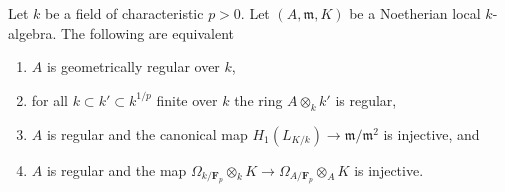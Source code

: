\begin{proposition}
\label{proposition-characterization-geometrically-regular}
Let $k$ be a field of characteristic $p > 0$.
Let $(A, \mathfrak m, K)$ be a Noetherian local
$k$-algebra. The following are equivalent
\begin{enumerate}
\item $A$ is geometrically regular over $k$,
\item for all $k \subset k' \subset k^{1/p}$
finite over $k$ the ring $A \otimes_k k'$ is regular,
\item $A$ is regular and the canonical map
$H_1(L_{K/k}) \to \mathfrak m/\mathfrak m^2$ is injective, and
\item $A$ is regular and the map
$\Omega_{k/\mathbf{F}_p} \otimes_k K \to \Omega_{A/\mathbf{F}_p} \otimes_A K$
is injective.
\end{enumerate}
\end{proposition}

